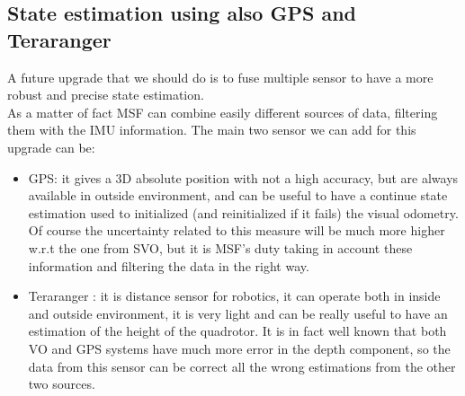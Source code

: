 \subsection{State estimation using also GPS and Teraranger}
A future upgrade that we should do is to fuse multiple sensor to have a more robust and precise state estimation.\\
As a matter of fact MSF can combine easily different sources of data, filtering them with the IMU information.
The main two sensor we can add for this upgrade can be:
\begin{itemize}
\item GPS: it gives a 3D absolute position with not a high accuracy, but are always available in outside environment, and can be useful to have a continue state estimation used to initialized (and reinitialized if it fails) the visual odometry. Of course the uncertainty related to this measure will be much more higher w.r.t the one from SVO, but it is MSF's duty taking in account these information and filtering the data in the right way.
\item Teraranger \cite{teraranger}: it is distance sensor for robotics, it can operate both in inside and outside environment, it is very light and can be really useful to have an estimation of the height of the quadrotor. It is in fact well known that both VO and GPS systems have much more error in the depth component, so the data from this sensor can be correct all the wrong estimations from the other two sources. 
\end{itemize}

